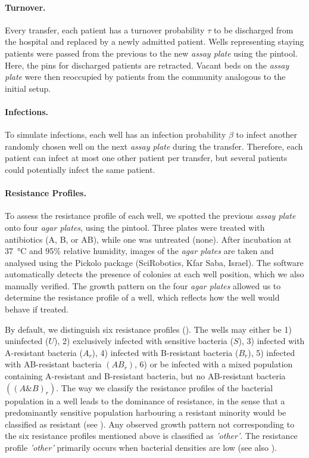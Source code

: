 \paragraph{Turnover.}
Every transfer, each patient has a turnover probability $\tau$ to be discharged from the hospital and replaced by a newly admitted patient.
Wells representing staying patients were passed from the previous to the new \textit{assay plate} using the pintool.
Here, the pins for discharged patients are retracted.
Vacant beds on the \textit{assay plate} were then reoccupied by patients from the community analogous to the initial setup.

\paragraph{Infections.}
To simulate infections, each well has an infection probability $\beta$ to infect another randomly chosen well on the next \textit{assay plate} during the transfer.
Therefore, each patient can infect at most one other patient per transfer, but several patients could potentially infect the same patient.

\paragraph{Resistance Profiles.\label{par:phenotyping}}
To assess the resistance profile of each well, we spotted the previous \textit{assay plate} onto four \textit{agar plates}, using the pintool.
Three plates were treated with antibiotics (A, B, or AB), while one was untreated (none).
After incubation at \SI{37}{\celsius} and 95\% relative humidity, images of the \textit{agar plates} are taken and analysed using the Pickolo package (SciRobotics, Kfar Saba, Israel). 
The software automatically detects the presence of colonies at each well position, which we also manually verified. 
The growth pattern on the four \textit{agar plates} allowed us to determine the resistance profile of a well, which reflects how the well would behave if treated.

By default, we distinguish six resistance profiles (). 
The wells may either be 1) uninfected ($U$), 2) exclusively infected with sensitive bacteria ($S$),  3) infected with A-resistant bacteria ($A_r$), 4) infected with B-resistant bacteria ($B_r$), 5) infected with AB-resistant bacteria $(AB_r)$, 6) or be infected with a mixed population containing A-resistant and B-resistant bacteria, but no AB-resistant bacteria $((A\&B)_r)$. 
The way we classify the resistance profiles of the bacterial population in a well leads to the dominance of resistance, in the sense that a predominantly sensitive population harbouring a resistant minority would be classified as resistant (see ). 
Any observed growth pattern not corresponding to the six resistance profiles mentioned above is classified as \textit{'other'}. 
The resistance profile \textit{'other'} primarily occurs when bacterial densities are low (see also ). 


